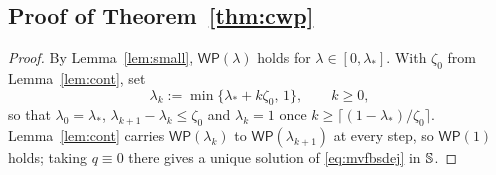 \subsection{Proof of Theorem~\texorpdfstring{\ref{thm:cwp}}{3.5}}\label{sub:proofcwp}

\begin{proof}
By Lemma~\ref{lem:small}, $\mathsf{WP}(\lambda)$ holds for $\lambda\in[0,\lambda_*]$. With
$\zeta_0$ from Lemma~\ref{lem:cont}, set
\[
\lambda_k:=\min\{\lambda_*+k\zeta_0,\,1\},\qquad k\ge0 ,
\]
so that $\lambda_0=\lambda_*$, $\lambda_{k+1}-\lambda_k\le\zeta_0$ and $\lambda_k=1$ once
$k\ge\lceil(1-\lambda_*)/\zeta_0\rceil$. Lemma~\ref{lem:cont} carries
$\mathsf{WP}(\lambda_k)$ to $\mathsf{WP}(\lambda_{k+1})$ at every step, so
$\mathsf{WP}(1)$ holds; taking $q\equiv0$ there gives a unique solution of
\eqref{eq:mvfbsdej} in $\mathbb{S}$.
\end{proof}

